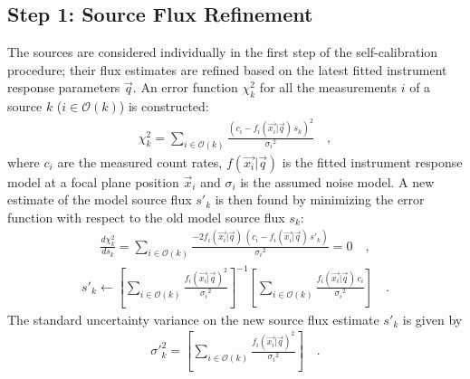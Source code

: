 \documentclass[preprint,pdftex]{aastex}
\begin{document}
\subsection{Step 1: Source Flux Refinement}
The sources are considered individually in the first step of the self-calibration procedure; their flux estimates are refined based on the latest fitted instrument response parameters $\vec{q}$. An error function $\chi^2_{k}$ for all the measurements $i$ of a source $k$ ($i \in \mathcal{O}(k)$) is constructed:
\begin{eqnarray*}
\chi^2_{k} = \sum_{i \in \mathcal{O}(k)} \frac{(c_i-f_{i}(\vec{x_i} | \vec{q}) \, s_{k})^2}{{\sigma_i}^2} \quad ,
\end{eqnarray*}
where $c_i$ are the measured count rates, $f(\vec{x_i} | \vec{q})$ is the fitted instrument response model at a focal plane position $\vec{x}_i$ and $\sigma_i$ is the assumed noise model. A new estimate of the model source flux $s'_{k}$ is then found by minimizing the error function with respect to the old model source flux $s_{k}$:
\begin{eqnarray*}
\frac{d\chi^2_{k}}{d s_{k}} = \sum_{i \in \mathcal{O}(k)} \frac{-2 f_{i}(\vec{x_i} | \vec{q}) \, (c_i-f_{i}(\vec{x_i} | \vec{q}) \, s'_{k})}{{\sigma_i}^2} = 0 \quad ,
\end{eqnarray*}
\begin{eqnarray*}
s'_{k} \leftarrow \left[{\sum_{i \in \mathcal{O}(k)}  \frac{f_{i}(\vec{x_i} | \vec{q})^2}{{\sigma_i}^2}} \right]^{-1}  \left[ {\sum_{i \in \mathcal{O}(k)} \frac{f_{i}(\vec{x_i} | \vec{q}) \, c_i}{{\sigma_i}^2}} \right] \quad .
\end{eqnarray*}
The standard uncertainty variance on the new source flux estimate $s'_{k}$ is given by
\begin{eqnarray*}
\sigma'^2_k = \left[{\sum_{i \in \mathcal{O}(k)}  \frac{f_{i}(\vec{x_i} | \vec{q})^2}{{\sigma_i}^2}} \right] \quad .
\end{eqnarray*}
\end{document}
